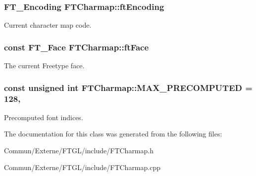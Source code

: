 \subsubsection[{\texorpdfstring{ft\+Encoding}{ftEncoding}}]{\setlength{\rightskip}{0pt plus 5cm}F\+T\+\_\+\+Encoding F\+T\+Charmap\+::ft\+Encoding\hspace{0.3cm}{\ttfamily [private]}}\hypertarget{class_f_t_charmap_ae8f674fb3bf3c47f195be0a4bda2a37c}{}\label{class_f_t_charmap_ae8f674fb3bf3c47f195be0a4bda2a37c}
Current character map code. 
\subsubsection[{\texorpdfstring{ft\+Face}{ftFace}}]{\setlength{\rightskip}{0pt plus 5cm}const {\bf F\+T\+\_\+\+Face} F\+T\+Charmap\+::ft\+Face\hspace{0.3cm}{\ttfamily [private]}}\hypertarget{class_f_t_charmap_ae377955e1d9bcc004572a7cd0a844dbf}{}\label{class_f_t_charmap_ae377955e1d9bcc004572a7cd0a844dbf}
The current Freetype face. 
\subsubsection[{\texorpdfstring{M\+A\+X\+\_\+\+P\+R\+E\+C\+O\+M\+P\+U\+T\+ED}{MAX_PRECOMPUTED}}]{\setlength{\rightskip}{0pt plus 5cm}const unsigned int F\+T\+Charmap\+::\+M\+A\+X\+\_\+\+P\+R\+E\+C\+O\+M\+P\+U\+T\+ED = 128\hspace{0.3cm}{\ttfamily [static]}, {\ttfamily [private]}}\hypertarget{class_f_t_charmap_a243b0c471388cc02b3d1ebbd88212e7e}{}\label{class_f_t_charmap_a243b0c471388cc02b3d1ebbd88212e7e}
Precomputed font indices. 

The documentation for this class was generated from the following files\+:\begin{DoxyCompactItemize}
\item 
Commun/\+Externe/\+F\+T\+G\+L/include/F\+T\+Charmap.\+h\item 
Commun/\+Externe/\+F\+T\+G\+L/include/F\+T\+Charmap.\+cpp\end{DoxyCompactItemize}
